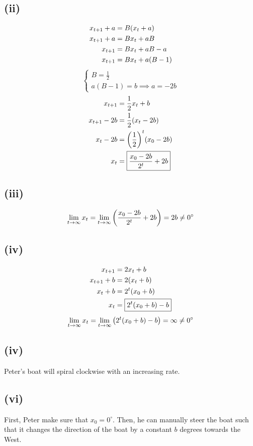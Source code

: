 \documentclass[a4paper]{article}
\begin{document}
\subsection*{(ii)}
\[\begin{aligned}
    x_{t+1}+a&=B\pqty{x_t+a}\\
    x_{t+1}+a&=Bx_t+aB\\
    x_{t+1}&=Bx_t+aB-a\\
    x_{t+1}&=Bx_t+a(B-1)\\
\end{aligned}\]
\[\begin{cases}
    B=\frac12\\
    a(B-1)=b\implies a=-2b
\end{cases}\]
\[\begin{aligned}
    x_{t+1}&=\frac12x_t+b\\
    x_{t+1}-2b&=\frac12\pqty{x_t-2b}\\
    x_t-2b&=\pqty{\frac12}^t\pqty{x_0-2b}\\
    x_t&=\boxed{\frac{x_0-2b}{2^t}+2b}
\end{aligned}\]
\subsection*{(iii)}
\[\lim\limits_{t\to\infty}x_t=\lim\limits_{t\to\infty}\pqty{\frac{x_0-2b}{2^t}+2b}=2b\ne0^\circ\]
\subsection*{(iv)}
\[\begin{aligned}
    x_{t+1}&=2x_t+b\\
    x_{t+1}+b&=2\pqty{x_t+b}\\
    x_t+b&=2^t\pqty{x_0+b}\\
    x_t&=\boxed{2^t\pqty{x_0+b}-b}
\end{aligned}\]
\[\lim\limits_{t\to\infty}x_t=\lim\limits_{t\to\infty}\pqty{2^t\pqty{x_0+b}-b}=\infty\ne0^\circ\]
\subsection*{(iv)}
Peter's boat will spiral clockwise with an increasing rate.
\subsection*{(vi)}
First, Peter make sure that \(x_0=0^\circ\). Then, he can manually steer the boat such that it changes the direction of the boat by a constant \(b\) degrees towards the West.
\end{document}
